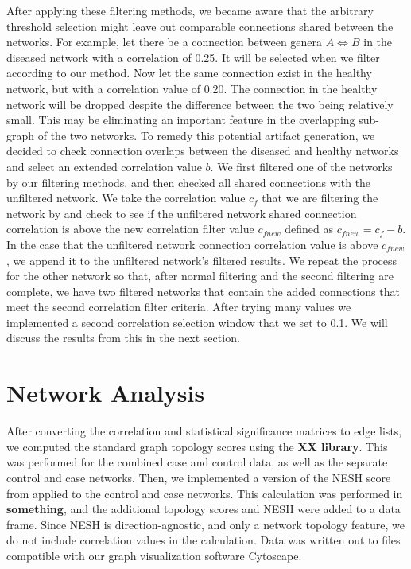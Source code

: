 After applying these filtering methods, we became aware that the arbitrary threshold selection might leave out comparable connections shared between the networks. For example, let there be a connection between genera $A \Leftrightarrow B$ in the diseased network with a correlation of 0.25. It will be selected when we filter according to our method. Now let the same connection exist in the healthy network, but with a correlation value of 0.20. The connection in the healthy network will be dropped despite the difference between the two being relatively small. This may be eliminating an important feature in the overlapping sub-graph of the two networks. To remedy this potential artifact generation, we decided to check connection overlaps between the diseased and healthy networks and select an extended correlation value $b$. We first filtered one of the networks by our filtering methods, and then checked all shared connections with the unfiltered network. We take the correlation value $c_f$ that we are filtering the network by and check to see if the unfiltered network shared connection correlation is above the new correlation filter value $c_{f new}$ defined as $c_{f new} = c_f - b$. In the case that the unfiltered network connection correlation value is above $c_{f new}$, we append it to the unfiltered network's filtered results. We repeat the process for the other network so that, after normal filtering and the second filtering are complete, we have two filtered networks that contain the added connections that meet the second correlation filter criteria. After trying many values we implemented a second correlation selection window that we set to 0.1. We will discuss the results from this in the next section. 



\section{Network Analysis}\label{meth:net_analysis}
After converting the correlation and statistical significance matrices to edge lists, we computed the standard graph topology scores using the \textbf{XX library}. This was performed for the combined case and control data, as well as the separate control and case networks. Then, we implemented a version of the \acrshort{NESH} score from \citeauthor{Kuntal2018} applied to the control and case networks. This calculation was performed in \textbf{something}, and the additional topology scores and \acrshort{NESH} were added to a data frame. Since \acrshort{NESH} is direction-agnostic, and only a network topology feature, we do not include correlation values in the calculation. Data was written out to files compatible with our graph visualization software Cytoscape.

